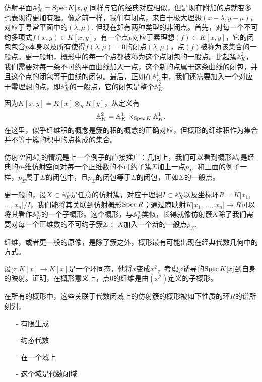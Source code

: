 
仿射平面$\mathbb{A}^2_K=\operatorname{Spec} K[x,y]$同样与它的经典对应相似，但是现在附加的点就变多也表现得更加有趣。像之前一样，我们有闭点，来自于极大理想$(x-\lambda,y-\mu)$，对应于寻常平面中的$(\lambda,\mu)$. 但现在却有两种类型的非闭点。首先，对每一个不可约多项式$f(x,y)\in K[x,y]$，有一个点$p$对应于素理想$(f)\subset K[x,y]$，它的闭包包含$p$本身以及所有使得$f(\lambda,\mu)=0$的闭点$(\lambda,\mu)$，点$(f)$被称为该集合的一般点。更一般地，概形中的每一个点都被称为这个点闭包的一般点。比起簇$\mathbb{A}^2_K$，我们需要对每一条不可约平面曲线加入一点，这个新的点属于这条曲线的闭包，并且这个点的闭包等于曲线的闭包。最后，正如在$\mathbb{A}^1_K$中，我们还需要加入一个对应于零理想的点，即$\mathbb{A}^2_K$的一般点，它的闭包是整个$\mathbb{A}^2_K$.


因为$K[x,y]=K[x]\otimes_K K[y]$，从定义有
\[
	\mathbb{A}^2_K=\mathbb{A}^1_K\times_{\operatorname{Spec} K}\mathbb{A}^1_K.
\]
在这里，似乎纤维积的概念是簇的积的概念的正确对应，但概形的纤维积作为集合并不等于簇的积中的点构成的集合。

仿射空间$\mathbb{A}^n_K$的情况是上一个例子的直接推广：几何上，我们可以看到概形$\mathbb{A}^n_K$是经典的$n$-维仿射空间对每一个正维数的不可约子簇$\Sigma$加上一点$p_\Sigma$. 和上面的例子一样，$p_\Sigma$属于$\Sigma$的闭包中，且$p_\Sigma$的闭包等于$\Sigma$的闭包，正如$\Sigma$的一般点。

更一般的，设$X\subset \mathbb{A}^n_K$是任意的仿射簇，对应于理想$I\subset \mathbb{A}^n_K$以及坐标环$R=K[x_1$, $\dots$, $x_n]/I$，我们能将其关联到仿射概形$\operatorname{Spec} R$；通过商映射$K[x_1$, $\dots$, $x_n]\to R$可以将其看作$\mathbb{A}^n_K$的一个子概形。这个概形，与$\mathbb{A}^n_K$类似，长得就像仿射簇$X$除了我们需要对每一个正维数的不可约子簇$\Sigma\subset X$加入一个新的一般点$p_\Sigma$.

纤维，或者更一般的原像，是除了簇之外，概形最有可能出现在经典代数几何中的方式。

\begin{exe} \label{exe.2.2}
设$\varphi:K[x]\to K[x]$是一个环同态，他将$x$变成$x^2$，考虑$\varphi$诱导的$\operatorname{Spec} K[x]$到自身的映射。证明，在概形意义上，点$0$的纤维是由$(x^2)$定义的子概形。

\end{exe}

在所有的概形中，这些关联于代数闭域上的仿射簇的概形被如下性质的环$R$的谱所刻划，

\begin{itemize}\setlength{\itemsep}{0pt}
\item[-] 有限生成
\item[-] 约态代数
\item[-] 在一个域上
\item[-] 这个域是代数闭域
\end{itemize}

